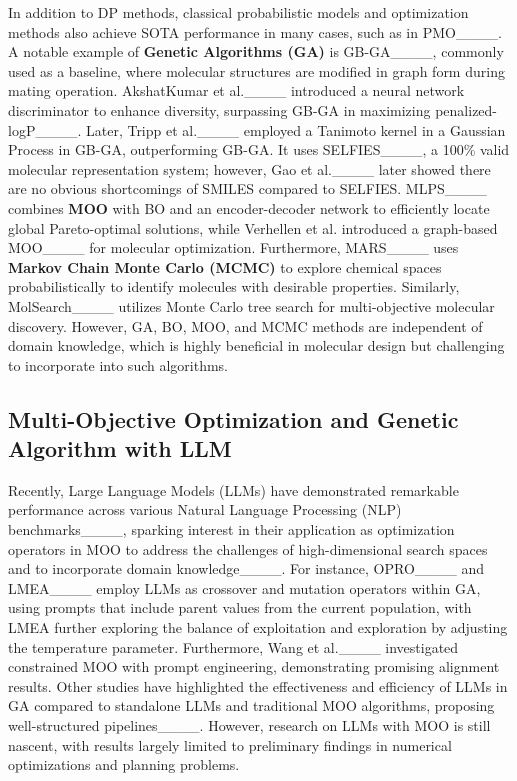 In addition to DP methods, classical probabilistic models and optimization methods also achieve SOTA performance in many cases, such as in PMO____. A notable example of \textbf{Genetic Algorithms (GA)} is GB-GA____, commonly used as a baseline, where molecular structures are modified in graph form during mating operation. AkshatKumar et al.____ introduced a neural network discriminator to enhance diversity, surpassing GB-GA in maximizing penalized-logP____. Later, Tripp et al.____ employed a Tanimoto kernel in a Gaussian Process in GB-GA, outperforming GB-GA. It uses SELFIES____, a 100\% valid molecular representation system; however, Gao et al.____ later showed there are no obvious shortcomings of SMILES compared to SELFIES. MLPS____ combines \textbf{MOO} with BO and an encoder-decoder network to efficiently locate global Pareto-optimal solutions, while Verhellen et al. introduced a graph-based MOO____ for molecular optimization. Furthermore, MARS____ uses \textbf{Markov Chain Monte Carlo (MCMC)} to explore chemical spaces probabilistically to identify molecules with desirable properties. Similarly, MolSearch____ utilizes Monte Carlo tree search for multi-objective molecular discovery. However, GA, BO, MOO, and MCMC methods are independent of domain knowledge, which is highly beneficial in molecular design but challenging to incorporate into such algorithms.


\subsection{Multi-Objective Optimization and Genetic Algorithm with LLM}
Recently, Large Language Models (LLMs) have demonstrated remarkable performance across various Natural Language Processing (NLP) benchmarks____, sparking interest in their application as optimization operators in MOO to address the challenges of high-dimensional search spaces and to incorporate domain knowledge____. For instance, OPRO____ and LMEA____ employ LLMs as crossover and mutation operators within GA, using prompts that include parent values from the current population, with LMEA further exploring the balance of exploitation and exploration by adjusting the temperature parameter. Furthermore, Wang et al.____ investigated constrained MOO with prompt engineering, demonstrating promising alignment results. Other studies have highlighted the effectiveness and efficiency of LLMs in GA compared to standalone LLMs and traditional MOO algorithms, proposing well-structured pipelines____. However, research on LLMs with MOO is still nascent, with results largely limited to preliminary findings in numerical optimizations and planning problems.

